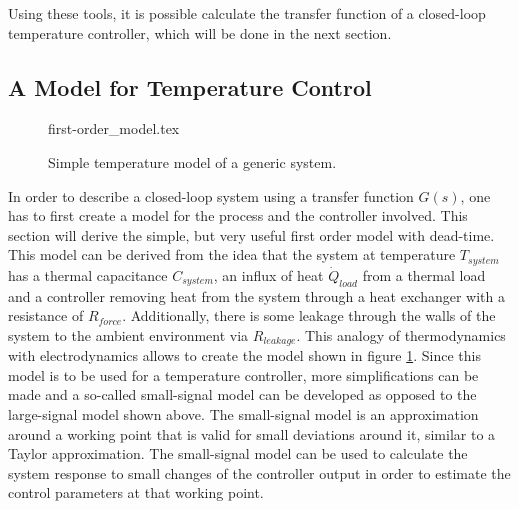 Using these tools, it is possible calculate the transfer function of a closed-loop temperature controller, which will be done in the next section.

\subsection{A Model for Temperature Control}%
\label{sec:temperature_control_model}
\begin{figure}[ht]
    \centering
        {first-order_model.tex}
    \caption{Simple temperature model of a generic system.}
    \label{fig:first-order_model_room}
\end{figure}

In order to describe a closed-loop system using a transfer function $G(s)$, one has to first create a model for the process and the controller involved. This section will derive the simple, but very useful first order model with dead-time. This model can be derived from the idea that the system at temperature $T_{system}$ has a thermal capacitance $C_{system}$, an influx of heat $\dot Q_{load}$ from a thermal load and a controller removing heat from the system through a heat exchanger with a resistance of $R_{force}$. Additionally, there is some leakage through the walls of the system to the ambient environment via $R_{leakage}$. This analogy of thermodynamics with electrodynamics allows to create the model shown in figure \ref{fig:first-order_model_room}. Since this model is to be used for a temperature controller, more simplifications can be made and a so-called small-signal model can be developed as opposed to the large-signal model shown above. The small-signal model is an approximation around a working point that is valid for small deviations around it, similar to a Taylor approximation. The small-signal model can be used to calculate the system response to small changes of the controller output in order to estimate the control parameters at that working point.

